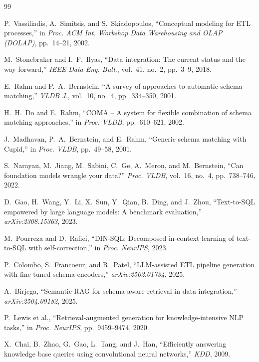 \documentclass[9pt,a4paper,twocolumn,twoside]{rho-class/rho}
\begin{document}
\begin{thebibliography}{99}

P.~Vassiliadis, A.~Simitsis, and S.~Skiadopoulos,
``Conceptual modeling for ETL processes,''
in \textit{Proc. ACM Int. Workshop Data Warehousing and OLAP (DOLAP)}, pp.~14--21, 2002.

M.~Stonebraker and I.~F.~Ilyas,
``Data integration: The current status and the way forward,''
\textit{IEEE Data Eng. Bull.}, vol.~41, no.~2, pp.~3--9, 2018.

E.~Rahm and P.~A.~Bernstein,
``A survey of approaches to automatic schema matching,''
\textit{VLDB J.}, vol.~10, no.~4, pp.~334--350, 2001.

H.~H.~Do and E.~Rahm,
``COMA -- A system for flexible combination of schema matching approaches,''
in \textit{Proc. VLDB}, pp.~610--621, 2002.

J.~Madhavan, P.~A.~Bernstein, and E.~Rahm,
``Generic schema matching with Cupid,''
in \textit{Proc. VLDB}, pp.~49--58, 2001.

S.~Narayan, M.~Jiang, M.~Sabini, C.~Ge, A.~Meron, and M.~Bernstein,
``Can foundation models wrangle your data?''
\textit{Proc. VLDB}, vol.~16, no.~4, pp.~738--746, 2022.

D.~Gao, H.~Wang, Y.~Li, X.~Sun, Y.~Qian, B.~Ding, and J.~Zhou,
``Text-to-SQL empowered by large language models: A benchmark evaluation,''
\textit{arXiv:2308.15363}, 2023.

M.~Pourreza and D.~Rafiei,
``DIN-SQL: Decomposed in-context learning of text-to-SQL with self-correction,''
in \textit{Proc. NeurIPS}, 2023.

P.~Colombo, S.~Francoeur, and R.~Patel,
``LLM-assisted ETL pipeline generation with fine-tuned schema encoders,''
\textit{arXiv:2502.01734}, 2025.

A.~Birjega,
``Semantic-RAG for schema-aware retrieval in data integration,''
\textit{arXiv:2504.09182}, 2025.

P.~Lewis et al.,
``Retrieval-augmented generation for knowledge-intensive NLP tasks,''
in \textit{Proc. NeurIPS}, pp.~9459--9474, 2020.

X.~Chai, B.~Zhao, G.~Gao, L.~Tang, and J.~Han,
``Efficiently answering knowledge base queries using convolutional neural networks,''
\textit{KDD}, 2009.


\end{thebibliography}
\end{document}

